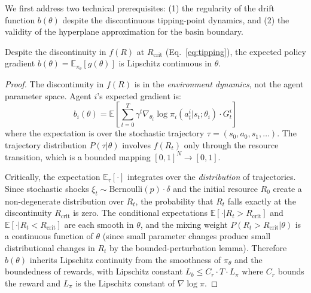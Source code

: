 We first address two technical prerequisites: (1) the regularity of the drift function $b(\theta)$ despite the discontinuous tipping-point dynamics, and (2) the validity of the hyperplane approximation for the basin boundary.

\begin{lemma}
\label{lem:lipschitz_drift}
Despite the discontinuity in $f(R)$ at $R_{\mathrm{crit}}$ (Eq.~\ref{eq:tipping}), the expected policy gradient $b(\theta) = \mathbb{E}_{\pi_\theta}[g(\theta)]$ is Lipschitz continuous in $\theta$.
\end{lemma}
\begin{proof}
The discontinuity in $f(R)$ is in the \emph{environment dynamics}, not the agent parameter space. Agent $i$'s expected gradient is:
\[
  b_i(\theta) = \mathbb{E}\!\left[\sum_{t=0}^T \gamma^t \nabla_{\theta_i} \log \pi_i(a_t^i | s_t; \theta_i) \cdot G_t^i \right]
\]
where the expectation is over the stochastic trajectory $\tau = (s_0, a_0, s_1, \ldots)$. The trajectory distribution $P(\tau | \theta)$ involves $f(R_t)$ only through the resource transition, which is a bounded mapping $[0,1]^N \to [0,1]$.

Critically, the expectation $\mathbb{E}_\tau[\cdot]$ integrates over the \emph{distribution} of trajectories. Since stochastic shocks $\xi_t \sim \text{Bernoulli}(p) \cdot \delta$ and the initial resource $R_0$ create a non-degenerate distribution over $R_t$, the probability that $R_t$ falls exactly at the discontinuity $R_{\mathrm{crit}}$ is zero. The conditional expectations $\mathbb{E}[\cdot | R_t > R_{\mathrm{crit}}]$ and $\mathbb{E}[\cdot | R_t < R_{\mathrm{crit}}]$ are each smooth in $\theta$, and the mixing weight $P(R_t > R_{\mathrm{crit}} | \theta)$ is a continuous function of $\theta$ (since small parameter changes produce small distributional changes in $R_t$ by the bounded-perturbation lemma). Therefore $b(\theta)$ inherits Lipschitz continuity from the smoothness of $\pi_\theta$ and the boundedness of rewards, with Lipschitz constant $L_b \leq C_r \cdot T \cdot L_\pi$ where $C_r$ bounds the reward and $L_\pi$ is the Lipschitz constant of $\nabla \log \pi$.
\end{proof}

